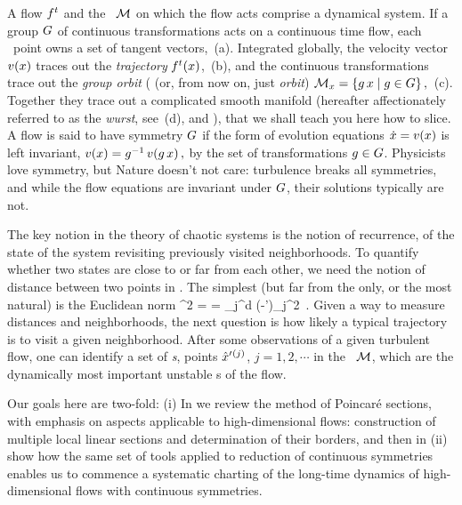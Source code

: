 A flow $f^t$ and the \statesp\ ${\cal M}$ on which the flow acts comprise a
{dynamical system}.
If a group $G$ of continuous transformations acts on a continuous
time flow, each \statesp\ point owns a set of tangent vectors,
\,(a). Integrated globally, the velocity vector
$v(x)$ traces out the {\em trajectory} ${f^{t}(x)}$,
\,(b), and the continuous transformations trace out
the \emph{group orbit} ( (or,
from now on, just \emph{orbit})
\(
{\cal M}_{x} = \{g\,x \mid g \in {\ensuremath{G}}\}
\,,
\) %
\,(c). Together they trace out a complicated smooth
manifold (hereafter affectionately referred to as the {\em wurst}, see
\,(d),  and ), that we shall
teach you here how to slice.
A flow is said to have symmetry $G$ if the form of evolution
equations $\dot{x} = v(x)$ is left invariant,
\(
v(x)=g^{-1} \, v(g \, x)
\,,
\) %
by the set of transformations $g \in {\ensuremath{G}}$. Physicists love
symmetry, but Nature doesn't not care: turbulence breaks all symmetries,
and while the flow equations are invariant under $G$, their
solutions typically are not.

The key notion in the theory of chaotic systems is the notion of
recurrence, of the state of the system revisiting previously visited
neighborhoods. To quantify whether two states are close to or far from
each other, we need the notion of distance between two points in
\statesp. The simplest (but far from the only, or the most natural) is
the Euclidean norm
\beq
  ^2  =  =
\sum_j^d
(\ssp-\ssp')_j^2
\,.
Given a way to measure distances and neighborhoods, the next question is
how likely a typical trajectory is to visit a given neighborhood.
After some observations of a given turbulent flow, one can identify a set
of \emph{\template s}, {points}
${\hat{x}'}{}^{(j)}$, $j=1,2,\cdots$ in the \statesp\ ${\cal M}$, which are the
dynamically most important unstable {\recurrStr s} of the flow.

Our goals here are two-fold:
(i) In  we review the method of Poincar\'e sections, with
    emphasis on aspects applicable to high-dimensional flows: construction of
    multiple local linear sections and determination of their borders, and then in
(ii)  show how the same set of tools applied to
    reduction of continuous symmetries enables us to commence a
    systematic charting of the long-time dynamics of high-dimensional
    flows with continuous symmetries.

